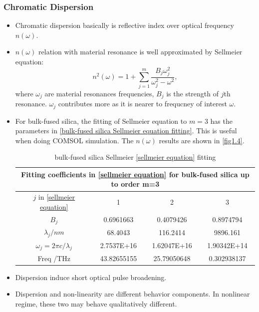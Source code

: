 \documentclass[12pt]{extarticle}
\numberwithin{equation}{section}
\numberwithin{figure}{section}
\numberwithin{table}{section}
\newcommand{\<}{\langle}
\renewcommand{\>}{\rangle}
\theoremstyle{definition}
\begin{document}
        \subsubsection{Chromatic Dispersion}
            \begin{itemize}
                \item Chromatic dispersion basically is reflective index over optical frequency $n(\omega)$.
                \item $n(\omega)$ relation with material resonance is well approximated by Sellmeier equation:
                    \begin{equation}
                        n^2(\omega) = 1 + \sum_{j=1}^m \frac{B_j \omega_j^2}{\omega_j^2-\omega^2},
                        \label{sellmeier equation}
                    \end{equation}
                    where $\omega_j$ are material resonances frequencies, $B_j$ is the strength of $j$th resonance. $\omega_j$ contributes more as it is nearer to frequcney of interest $\omega$.
                \item For bulk-fused silica, the fitting of Sellmeier equation to $m = 3$ has the parameters in \autoref{bulk-fused silica Sellmeier equation fitting}. This is useful when doing COMSOL simulation. The $n(\omega)$ results are shown in \autoref{fig1.4}.
                    \begin{table}[htbp]
                    \centering
                        \begin{tabular}{|c|c|c|c|}
                        \hline
                        \multicolumn{4}{|c|}{Fitting coefficients in \autoref{sellmeier equation} for bulk-fused silica up to order m=3} \\
                        \hline
                        $j$ in \autoref{sellmeier equation} & 1       & 2           & 3           \\ \hline
                        $B_j$                          & 0.6961663   & 0.4079426   & 0.8974794   \\ \hline
                        $\lambda_j / nm$               & 68.4043     & 116.2414    & 9896.161    \\ \hline
                        $\omega_j =2\pi c/\lambda_j$   & 2.7537E+16  & 1.62047E+16 & 1.90342E+14 \\ \hline
                        Freq /THz                      & 43.82655155 & 25.79050648 & 0.302938137 \\ \hline
                        \end{tabular}
                    \caption{bulk-fused silica Sellmeier \autoref{sellmeier equation} fitting}
                    \label{bulk-fused silica Sellmeier equation fitting}
                    \end{table}
                \item Dispersion induce short optical pulse broadening.
                \item Dispersion and non-linearity are different behavior components. In nonlinear regime, these two may behave qualitatively different.
                

\end{itemize}
\end{document}
